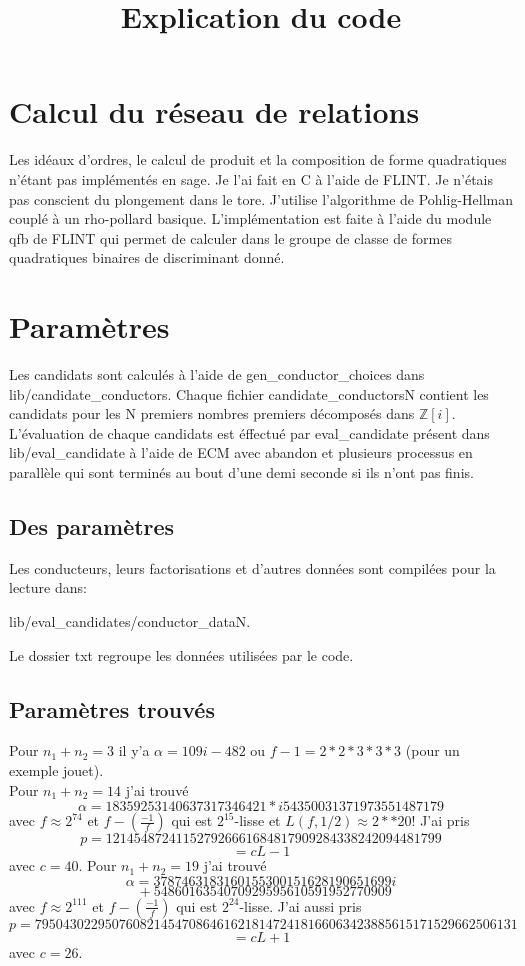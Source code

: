 \documentclass[12pt]{article}
\theoremstyle{plain}
\theoremstyle{definition}
\newcommand{\Z}{\mathbb{Z}}
\begin{document}
\title{Explication du code}
\maketitle

\section{Calcul du réseau de relations}
Les idéaux d'ordres, le calcul de produit et la composition de forme quadratiques n'étant pas implémentés 
en sage. Je l'ai fait en C à l'aide de FLINT. Je n'étais pas conscient du plongement dans le tore.
J'utilise l'algorithme de Pohlig-Hellman couplé à un rho-pollard basique. L'implémentation 
est faite à l'aide du module qfb de FLINT qui permet de calculer dans le groupe de classe de 
formes quadratiques binaires de discriminant donné.

\section{Paramètres}
Les candidats sont calculés à l'aide de 
gen\_conductor\_choices dans lib/candidate\_conductors. Chaque 
fichier candidate\_conductorsN contient les 
candidats pour les N premiers nombres 
premiers décomposés dans $\Z[i]$. L'évaluation 
de chaque candidats est éffectué par 
eval\_candidate présent dans lib/eval\_candidate
à l'aide de ECM avec abandon et plusieurs processus 
en parallèle qui sont terminés au bout d'une demi seconde 
si ils n'ont pas finis. 

\subsection{Des paramètres}
Les conducteurs, leurs factorisations et d'autres données sont compilées pour la lecture dans:
\begin{center}
  lib/eval\_candidates/conductor\_dataN.
\end{center}
Le dossier txt regroupe les données utilisées par le code.
\subsection{Paramètres trouvés}
Pour $n_1+n_2=3$ il y'a $\alpha=109i-482$ ou $f-1=2*2*3*3*3$ (pour un exemple jouet).\\
Pour $n_1+n_2=14$ j'ai trouvé
\[\alpha=18359253140637317346421*i 54350031371973551487179\]
avec $f\approx 2^{74}$ et $f- (\frac{-1}{f})$ 
qui est $2^{15}$-lisse et $L(f,1/2)\approx 2**20$! J'ai pris
\[p=
121454872411527926661684817909284338242094481799
\]\[=cL-1\]
 avec $c=40$.
Pour $n_1+n_2=19$ j'ai trouvé
\[\alpha=3787463183160155300151628190651699i
\]
\[~~+5486016354070929595610591952770909
\]
avec $f\approx 2^{111}$ et $f-(\frac{-1}{f})$
qui est $2^{24}$-lisse. J'ai aussi pris \[
    p= 795043022950760821454708646162181472418166063423885615171529662506131
    \]
\[=cL+1\] avec $c=26$.
\end{document}
